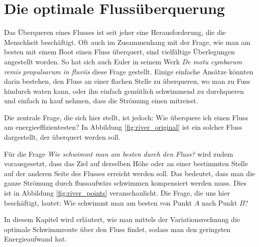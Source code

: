 %
%
%
%

\chapter{Die optimale Flussüberquerung\label{chapter:schwimmen}}
\begin{refsection}

\noindent
Das Überqueren eines Flusses ist seit jeher eine Herausforderung,
die die Menschheit beschäftigt. Oft auch im Zusammenhang mit der
Frage, wie man am besten mit einem Boot einen Fluss überquert, sind
vielfältige Überlegungen angestellt worden. So hat sich auch Euler
in seinem Werk \textit{De motu cymbarum remis propulsarum in fluviis}
\cite{schwimmen:Euler_works} diese Frage gestellt. Einige einfache
Ansätze könnten darin bestehen, den Fluss an einer flachen Stelle
zu überqueren, wo man zu Fuss hindurch waten kann, oder ihn einfach
gemütlich schwimmend zu durchqueren und einfach in kauf nehmen,
dass die Strömung einen mitreisst.
	
	
Die zentrale Frage, die sich hier stellt, ist jedoch: Wie überquere
ich einen Fluss am energieeffizientesten? In Abbildung
\ref{fig:river_original} ist ein solcher Fluss dargestellt, der
überquert werden soll.

%

Für die Frage \textit{Wie schwimmt man am besten durch den Fluss?}
wird zudem vorausgesetzt, dass das Ziel auf derselben Höhe oder an
einer bestimmten Stelle auf der anderen Seite des Flusses erreicht
werden soll. Das bedeutet, dass man die ganze Strömung durch
flussaufwärs schwimmen kompensiert werden muss. Dies ist in Abbildung
\ref{fig:river_points} veranschaulicht. Die Frage, die uns hier
beschäftigt, lautet: Wie schwimmt man am besten von Punkt \(A\)
nach Punkt \(B\)?

%

In diesem Kapitel wird erläutert, wie man mittels der Variationsrechnung
die optimale Schwimmroute über den Fluss findet, sodass man den
geringsten Energieaufwand hat.






\printbibliography[heading=subbibliography]
\end{refsection}

